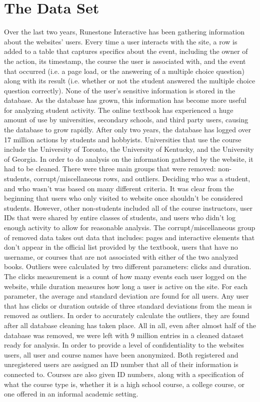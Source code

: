\section*{The Data Set}

Over the last two years, Runestone Interactive has been gathering information about the websites’ users. Every time a user interacts with the site, a row is added to a table that captures specifics about the event, including the owner of the action, its timestamp, the course the user is associated with, and the event that occurred (i.e. a page load, or the answering of a multiple choice question) along with its result (i.e. whether or not the student answered the multiple choice question correctly). None of the user’s sensitive information is stored in the database. As the database has grown, this information has become more useful for analyzing student activity.   
The online textbook has experienced a huge amount of use by universities, secondary schools, and third party users, causing the database to grow rapidly. After only two years, the database has logged over 17 million actions by students and hobbyists. Universities that use the course include the University of Toronto, the University of Kentucky, and the University of Georgia.
In order to do analysis on the information gathered by the website, it had to be cleaned. There were three main groups that were removed: non-students, corrupt/miscellaneous rows, and outliers. Deciding who was a student, and who wasn’t was based on many different criteria. It was clear from the beginning that users who only visited to website once shouldn’t be considered students. However, other non-students included all of the course instructors, user IDs that were shared by entire classes of students, and users who didn’t log enough activity to allow for reasonable analysis. 
The corrupt/miscellaneous group of removed data takes out data that includes: pages and interactive elements that don’t appear in the official list provided by the textbook, users that have no username, or courses that are not associated with either of the two analyzed books.  
Outliers were calculated by two different parameters: clicks and duration. The clicks measurement is a count of how many events each user logged on the website, while duration measures how long a user is active on the site. For each parameter, the average and standard deviation are found for all users. Any user that has clicks or duration outside of three standard deviations from the mean is removed as outliers. In order to accurately calculate the outliers, they are found after all database cleaning has taken place. All in all, even after almost half of the database was removed, we were left with 9 million entries in a cleaned dataset ready for analysis. 
In order to provide a level of confidentiality to the websites users, all user and course names have been anonymized. Both registered and unregistered users are assigned an ID number that all of their information is connected to. Courses are also given ID numbers, along with a specification of what the course type is, whether it is a high school course, a college course, or one offered in an informal academic setting.  

